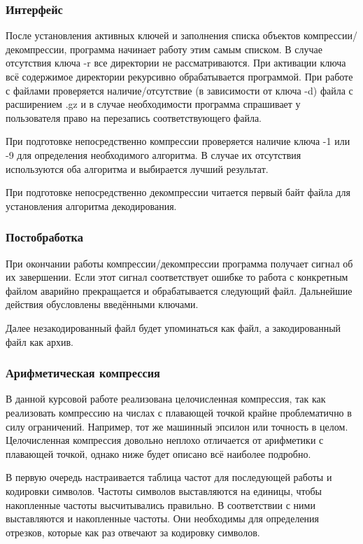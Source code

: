 \documentclass[12pt]{article}
\begin{document}
\subsubsection*{Интерфейс}

После установления активных ключей и заполнения списка объектов компрессии/декомпрессии, программа начинает работу  этим самым списком. В случае отсутствия ключа -r все директории не рассматриваются. При активации ключа всё содержимое директории рекурсивно обрабатывается программой. При работе с файлами проверяется наличие/отсутствие (в зависимости от ключа -d) файла с расширением .gz и в случае необходимости программа спрашивает у пользователя право на перезапись соответствующего файла.

При подготовке непосредственно компрессии проверяется наличие ключа -1 или -9 для определения необходимого алгоритма. В случае их отсутствия используются оба алгоритма и выбирается лучший результат.

При подготовке непосредственно декомпрессии читается первый байт файла для установления алгоритма декодирования.

\subsubsection*{Постобработка}

При окончании работы компрессии/декомпрессии программа получает сигнал об их завершении. Если этот сигнал соответствует ошибке то работа с конкретным файлом аварийно прекращается и обрабатывается следующий файл. Дальнейшие действия обусловлены введёнными ключами.

Далее незакодированный файл будет упоминаться как файл, а закодированный файл как архив.%


\subsubsection*{Арифметическая компрессия}

В данной курсовой работе реализована целочисленная компрессия, так как реализовать компрессию на числах с плавающей точкой крайне проблематично в силу ограничений. Например, тот же машинный эпсилон или точность в целом. Целочисленная компрессия довольно неплохо отличается от арифметики с плавающей точкой, однако ниже будет описано всё наиболее подробно.

В первую очередь настраивается таблица частот для последующей работы и кодировки символов. Частоты символов выставляются на единицы, чтобы накопленные частоты высчитывались правильно. В соответствии с ними выставляются и накопленные частоты. Они необходимы для определения отрезков, которые как раз отвечают за кодировку символов.
\end{document}
